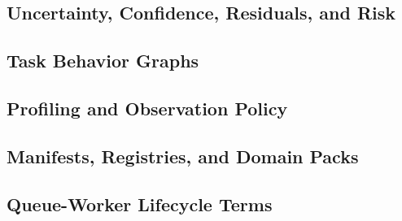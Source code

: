 \subsection{Uncertainty, Confidence, Residuals, and Risk}
\label{app:terms-uncertainty-confidence-risk}


\subsection{Task Behavior Graphs}
\label{app:terms-task-behavior-graphs}


\subsection{Profiling and Observation Policy}
\label{app:terms-profiling-observation-policy}


\subsection{Manifests, Registries, and Domain Packs}
\label{app:terms-manifests-registries-domain-packs}


\subsection{Queue-Worker Lifecycle Terms}
\label{app:terms-queue-worker-lifecycle}

